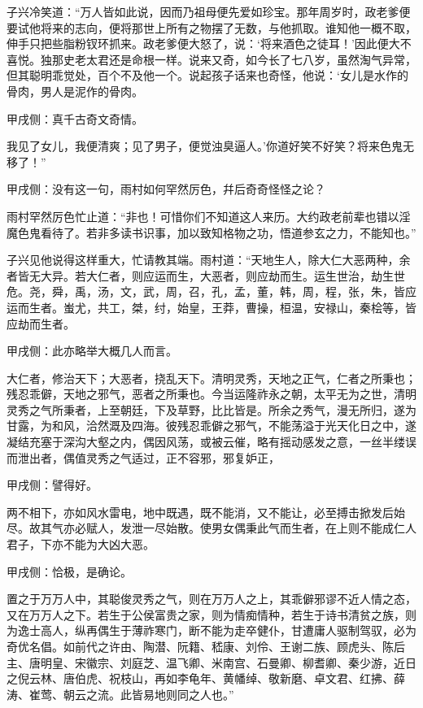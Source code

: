 \begin{parag}
    子兴冷笑道：“万人皆如此说，因而乃祖母便先爱如珍宝。那年周岁时，政老爹便要试他将来的志向，便将那世上所有之物摆了无数，与他抓取。谁知他一概不取，伸手只把些脂粉钗环抓来。政老爹便大怒了，说：‘将来酒色之徒耳！’因此便大不喜悦。独那史老太君还是命根一样。说来又奇，如今长了七八岁，虽然淘气异常，但其聪明乖觉处，百个不及他一个。说起孩子话来也奇怪，他说：‘女儿是水作的骨肉，男人是泥作的骨肉。\begin{note}甲戌侧：真千古奇文奇情。\end{note}我见了女儿，我便清爽；见了男子，便觉浊臭逼人。’你道好笑不好笑？将来色鬼无移了！”\begin{note}甲戌侧：没有这一句，雨村如何罕然厉色，幷后奇奇怪怪之论？\end{note}雨村罕然厉色忙止道：“非也！可惜你们不知道这人来历。大约政老前辈也错以淫魔色鬼看待了。若非多读书识事，加以致知格物之功，悟道参玄之力，不能知也。”
\end{parag}


\begin{parag}
    子兴见他说得这样重大，忙请教其端。雨村道：“天地生人，除大仁大恶两种，余者皆无大异。若大仁者，则应运而生，大恶者，则应劫而生。运生世治，劫生世危。尧，舜，禹，汤，文，武，周，召，孔，孟，董，韩，周，程，张，朱，皆应运而生者。蚩尤，共工，桀，纣，始皇，王莽，曹操，桓温，安禄山，秦桧等，皆应劫而生者。\begin{note}甲戌侧：此亦略举大概几人而言。\end{note}大仁者，修治天下；大恶者，挠乱天下。清明灵秀，天地之正气，仁者之所秉也；残忍乖僻，天地之邪气，恶者之所秉也。今当运隆祚永之朝，太平无为之世，清明灵秀之气所秉者，上至朝廷，下及草野，比比皆是。所余之秀气，漫无所归，遂为甘露，为和风，洽然溉及四海。彼残忍乖僻之邪气，不能荡溢于光天化日之中，遂凝结充塞于深沟大壑之内，偶因风荡，或被云催，略有摇动感发之意，一丝半缕误而泄出者，偶值灵秀之气适过，正不容邪，邪复妒正，\begin{note}甲戌侧：譬得好。\end{note}两不相下，亦如风水雷电，地中既遇，既不能消，又不能让，必至搏击掀发后始尽。故其气亦必赋人，发泄一尽始散。使男女偶秉此气而生者，在上则不能成仁人君子，下亦不能为大凶大恶。\begin{note}甲戌侧：恰极，是确论。\end{note}置之于万万人中，其聪俊灵秀之气，则在万万人之上，其乖僻邪谬不近人情之态，又在万万人之下。若生于公侯富贵之家，则为情痴情种，若生于诗书清贫之族，则为逸士高人，纵再偶生于薄祚寒门，断不能为走卒健仆，甘遭庸人驱制驾驭，必为奇优名倡。如前代之许由、陶潜、阮籍、嵇康、刘伶、王谢二族、顾虎头、陈后主、唐明皇、宋徽宗、刘庭芝、温飞卿、米南宫、石曼卿、柳耆卿、秦少游，近日之倪云林、唐伯虎、祝枝山，再如李龟年、黄幡绰、敬新磨、卓文君、红拂、薛涛、崔莺、朝云之流。此皆易地则同之人也。”
\end{parag}



